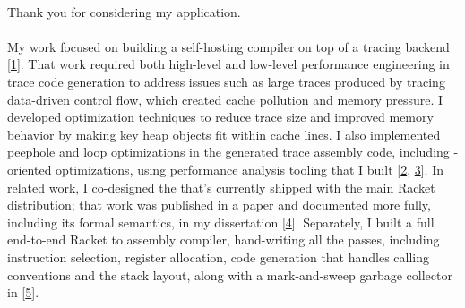 

\newcommand{\dissertationurl}{https://github.com/cderici/dissertation/releases/download/latest-pdf/thesis.pdf}
\newcommand{\pycketperfurl}{https://github.com/cderici/pycket-performance}
\newcommand{\tracedrawurl}{https://github.com/cderici/trace-draw}
\newcommand{\raxurl}{https://github.com/cderici/rax}
\newcommand{\icfpreporturl}{https://dl.acm.org/doi/10.1145/3341642}
\newcommand{\atwurl}{https://github.com/cderici/around-the-world-in-26-languages}
\newcommand{\homelaburl}{https://home.dericilab.live/homelab/}

\newcommand{\cairolang}{https://github.com/cderici/around-the-world-in-compilers/blob/main/langs/cairo/README.md}
\newcommand{\dublinlang}{https://github.com/cderici/around-the-world-in-compilers/blob/main/langs/dublin/README.md}
\newcommand{\edinlang}{https://github.com/cderici/around-the-world-in-compilers/blob/main/langs/edinburgh/README.md}




\paragraph{} %
Thank you for considering my application.

\paragraph{} %
My  work focused on building a self-hosting compiler on top of a tracing  backend [\href{\dissertationurl}{1}]. That work required both high-level and low-level performance engineering in trace code generation to address issues such as large traces produced by tracing data-driven control flow, which created cache pollution and memory pressure. I developed optimization techniques to reduce trace size and improved memory behavior by making key heap objects fit within  cache lines. I also implemented peephole and loop optimizations in the generated trace assembly code, including -oriented optimizations, using performance analysis tooling that I built [\href{\pycketperfurl}{2}, \href{\tracedrawurl}{3}]. In related work, I co-designed the  that's currently shipped with the main Racket distribution; that work was published in a paper and documented more fully, including its formal semantics, in my dissertation [\href{\icfpreporturl}{4}]. Separately, I built a full end-to-end Racket to  assembly compiler, hand-writing all the passes, including instruction selection, register allocation, code generation that handles calling conventions and the stack layout, along with a mark-and-sweep garbage collector in  [\href{\raxurl}{5}].


